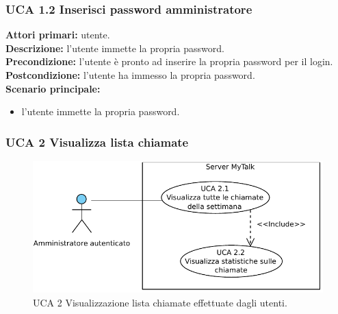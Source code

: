 \subsubsection{UCA 1.2 Inserisci password amministratore}
\noindent
\textbf{Attori primari:} utente.\\
\textbf{Descrizione:} l'utente immette la propria password.\\
\textbf{Precondizione:} l'utente è pronto ad inserire la propria password per il login.\\
\textbf{Postcondizione:} l'utente ha immesso la propria password.\\
\textbf{Scenario principale:}
\begin{itemize}
\item l'utente immette la propria password.
\end{itemize}

\newpage

\subsubsection{UCA 2 Visualizza lista chiamate}

\begin{figure}[htbp]
\centering
\includegraphics[scale=0.7]{./casi_uso/UCA2.pdf}
\caption{UCA 2 Visualizzazione lista chiamate effettuate dagli utenti.}
\end{figure}

